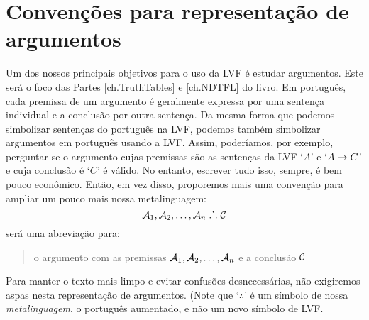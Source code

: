 \section{Convenções para representação de argumentos}
Um dos nossos principais objetivos para o uso da LVF é estudar argumentos. Este será o foco das Partes \ref{ch.TruthTables} e \ref{ch.NDTFL} do livro.
Em português, cada premissa de um argumento é geralmente expressa por uma sentença individual e a conclusão por outra sentença.
Da mesma forma que podemos simbolizar sentenças do português na LVF, podemos também simbolizar argumentos em português usando a LVF.
Assim, poderíamos, por exemplo, perguntar se o argumento cujas premissas são as sentenças da LVF `$A$' e `$A \rightarrow C$' e cuja conclusão é `$C$' é válido.
No entanto, escrever tudo isso, sempre, é bem pouco econômico.
Então, em vez disso, proporemos mais uma convenção para ampliar um pouco mais nossa metalinguagem:
	$$\mathcal{A}_1, \mathcal{A}_2, \ldots, \mathcal{A}_n \mathrel{\ldotp\dot{}\,\ldotp} \mathcal{C}$$
será uma abreviação para:
	\begin{quote}
		o argumento com as premissas $\mathcal{A}_1, \mathcal{A}_2, \ldots, \mathcal{A}_n$ e a conclusão $\mathcal{C}$
	\end{quote}
Para manter o texto mais limpo e evitar confusões desnecessárias, não exigiremos aspas nesta representação de argumentos.
(Note que `$\therefore$' é um símbolo de nossa \emph{metalinguagem}, o português aumentado, e não um novo símbolo de LVF.